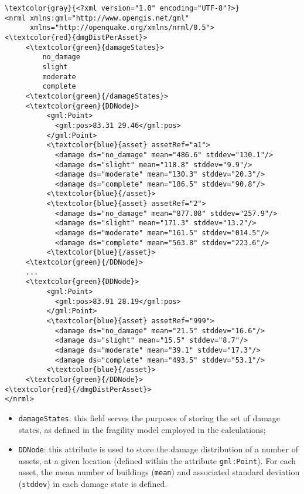 \begin{Verbatim}[frame=single, commandchars=\\\{\}, samepage=false]
\textcolor{gray}{<?xml version="1.0" encoding="UTF-8"?>}
<nrml xmlns:gml="http://www.opengis.net/gml"
      xmlns="http://openquake.org/xmlns/nrml/0.5">
<\textcolor{red}{dmgDistPerAsset}>
     <\textcolor{green}{damageStates}>
         no_damage
         slight
         moderate
         complete
     <\textcolor{green}{/damageStates}>
     <\textcolor{green}{DDNode}>
          <gml:Point>
            <gml:pos>83.31 29.46</gml:pos>
          </gml:Point>
          <\textcolor{blue}{asset} assetRef="a1">
            <damage ds="no_damage" mean="486.6" stddev="130.1"/>
            <damage ds="slight" mean="118.8" stddev="9.9"/>
            <damage ds="moderate" mean="130.3" stddev="20.3"/>
            <damage ds="complete" mean="186.5" stddev="90.8"/>
          <\textcolor{blue}{/asset}>
          <\textcolor{blue}{asset} assetRef="2">
            <damage ds="no_damage" mean="877.08" stddev="257.9"/>
            <damage ds="slight" mean="171.3" stddev="13.2"/>
            <damage ds="moderate" mean="161.5" stddev="014.5"/>
            <damage ds="complete" mean="563.8" stddev="223.6"/>
          <\textcolor{blue}{/asset}>
     <\textcolor{green}{/DDNode}>
     ...
     <\textcolor{green}{DDNode}>
          <gml:Point>
            <gml:pos>83.91 28.19</gml:pos>
          </gml:Point>
          <\textcolor{blue}{asset} assetRef="999">
            <damage ds="no_damage" mean="21.5" stddev="16.6"/>
            <damage ds="slight" mean="15.5" stddev="8.7"/>
            <damage ds="moderate" mean="39.1" stddev="17.3"/>
            <damage ds="complete" mean="493.5" stddev="53.1"/>
          <\textcolor{blue}{/asset}>
     <\textcolor{green}{/DDNode}>
<\textcolor{red}{/dmgDistPerAsset}>
</nrml>
\end{Verbatim}

\begin{itemize}
\item  \Verb+damageStates+: this field serves the purposes of storing the set of damage states, as defined in the \gls{fragility model} employed in the calculations;
\item  \Verb+DDNode+: this attribute is used to store the damage distribution of a number of \glspl{asset}, at a given location (defined within the attribute \Verb+gml:Point+). For each \gls{asset}, the mean number of buildings (\Verb+mean+) and associated standard deviation (\Verb+stddev+) in each damage state is defined.
\end{itemize}

